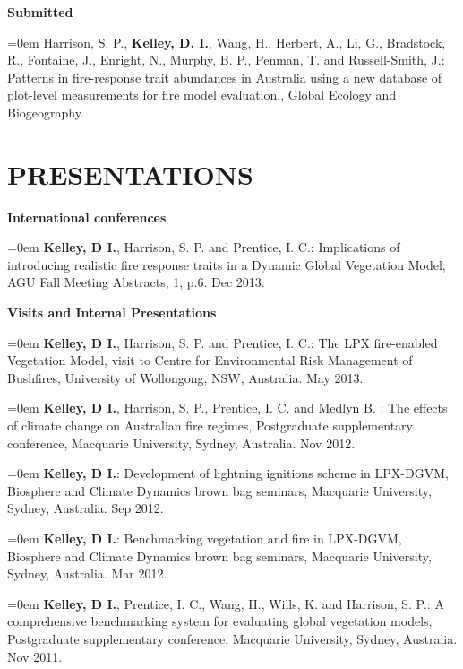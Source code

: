 \documentclass[paper=a4,fontsize=11pt]{scrartcl}	 			%
\newcommand{\sepspace}{\vspace*{0em}}			%
\newcommand{\NewPart}[1]{\vspace*{-0.5em} \section*{\uppercase{#1}} \vspace*{-0.75em} }
\newcommand{\BibEntry}[2]{
		\vspace*{-1em} \noindent \textbf{#1} \hfill \par					%
		\hangindent=0em\hangafter=0 \small #2} 	%
\begin{document}

\BibEntry{\newline \newline Submitted} {Harrison, S. P., \textbf{Kelley, D. I.}, Wang, H., Herbert, A., Li, G., Bradstock, R., Fontaine, J., Enright, N., Murphy, B. P., Penman, T. and Russell-Smith, J.: Patterns in fire-response trait abundances in Australia using a new database of plot-level measurements for fire model evaluation., Global Ecology and Biogeography.}


\NewPart{Presentations}
\BibEntry{\newline International conferences} {\textbf{Kelley, D I.}, Harrison, S. P. and Prentice, I. C.: Implications of introducing realistic fire response traits in a Dynamic Global Vegetation Model, AGU Fall Meeting Abstracts, 1,  p.6. Dec 2013.}
\sepspace

\BibEntry{\newline \newline  Visits and Internal Presentations} {\textbf{Kelley, D I.}, Harrison, S. P. and Prentice, I. C.: The LPX fire-enabled Vegetation Model, visit to Centre for Environmental Risk Management of Bushfires, University of Wollongong, NSW, Australia. May 2013.}

\BibEntry{} {\textbf{Kelley, D I.}, Harrison, S. P., Prentice, I. C. and Medlyn B. : The effects of climate change on Australian fire regimes, Postgraduate supplementary conference, Macquarie University, Sydney, Australia. Nov 2012.}

\BibEntry{} {\textbf{Kelley, D I.}: Development of lightning ignitions scheme in LPX-DGVM, Biosphere and Climate Dynamics brown bag seminars, Macquarie University, Sydney, Australia. Sep 2012.}

\BibEntry{} {\textbf{Kelley, D I.}: Benchmarking vegetation and fire in LPX-DGVM, Biosphere and Climate Dynamics brown bag seminars, Macquarie University, Sydney, Australia. Mar 2012.}

\BibEntry{} {\textbf{Kelley, D I.}, Prentice, I. C., Wang, H., Wills, K. and Harrison, S. P.: A comprehensive benchmarking system for evaluating global vegetation models, Postgraduate supplementary conference, Macquarie University, Sydney, Australia. Nov 2011.}
\end{document}
